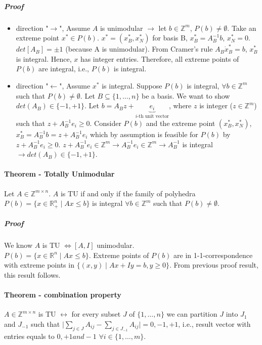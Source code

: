 \documentclass[main]{subfiles}
\begin{document}
\subparagraph{Proof}
\begin{itemize}
\item direction "$\rightarrow$", Assume $A$ is unimodular $\rightarrow$ let $b
\in \mathbb{Z}^{m}$, $P(b) \neq \emptyset$. Take an extreme point $x^{*} \in
P(b)$. $x^{*} = (x^{*}_{B}, x^{*}_{N})$ for basis B, $x^{*}_{B} = A^{-1}_{B}b$,
$x^{*}_{N} = 0$.\\
$det[A_{B}] = \pm 1$ (because A is unimodular). From Cramer's rule $A_{B} \dot
x^{*}_{B} = b$, $x^{*}_{B}$ is integral. Hence, $x$ has integer entries.
Therefore, all extreme points of $P(b)$ are integral, i.e., $P(b)$ is integral.

\item direction "$\leftarrow$", Assume $x^{*}$ is integral. Suppose $P(b)$ is
integral, $\forall b \in \mathbb{Z}^{m}$ such that $P(b) \neq \emptyset$. Let
$B \subseteq \{1, \dots, n\}$ be a basis. We want to show $det(A_{B}) \in \{-1,
+1\}$.
Let $b = A_{B}z + \underbrace{e_{i}}_{\text{$i$-th unit vector}}$, where $z$ is
integer ($z \in \mathbb{Z}^{m}$) such that $z + A^{-1}_{B} e_{i} \geq 0$.
Consider $P(b)$ and the extreme point $(x^{*}_{B}, x^{*}_{N})$, $x^{*}_{B} =
A^{-1}_{B}b = z + A^{-1}_{B} e_{i}$ which by assumption is feasible for $P(b)$
by $z + A^{-1}_{B} e_{i} \geq 0$. $z + A^{-1}_{B} e_{i} \in \mathbb{Z}^{m}
\rightarrow A^{-1}_{B} e_{i} \in \mathbb{Z}^{m} \rightarrow A^{-1}_{B}$ is
integral $\rightarrow det(A_{B}) \in \{-1, +1\}$.
\end{itemize}

\paragraph{Theorem - Totally Unimodular}
Let $A \in \mathbb{Z}^{m \times n}$. $A$ is TU if and only if the family of
polyhedra $P(b) = \{ x \in \mathbb{R}^{n}_+ \mid Ax \leq b \}$ is integral
$\forall b \in \mathbb{Z}^{m}$ such that $P(b) \neq \emptyset$.

\subparagraph{Proof}
We know $A$ is TU $\iff [A,I]$ unimodular.\\
$P(b) = \{x \in \mathbb{R}^{n} \mid Ax \leq b \}$. Extreme points of $P(b)$ are
in 1-1-correspondence with extreme points in $\{(x,y) \mid Ax + Iy = b, y \geq
0 \}$. From previous proof result, this result follows.

\paragraph{Theorem - combination property} $A \in \mathbb{Z}^{m \times n}$ is
TU $\leftrightarrow$ for every subset $J$ of $\{1, \dots, n\}$ we can partition
$J$ into $J_{1}$ and $J_{-1}$ such that $\mid \sum_{j \in J} A_{ij} -
\sum_{j \in J_{-1}} A_{ij} \mid = {0, -1, +1}$, i.e., result vector with
entries equals to $0, +1 and -1$ $\forall i \in \{1, \dots, m\}$.
\end{document}
